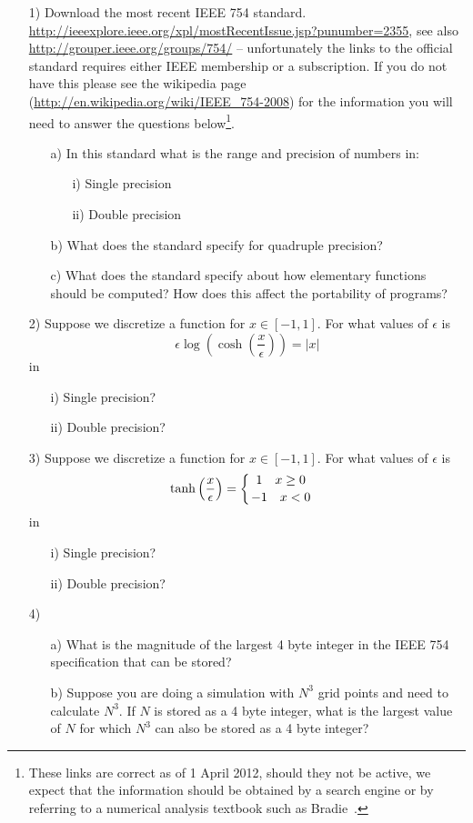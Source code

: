 \begin{enumerate}
\item[1)] Download the most recent IEEE 754 standard. \url{http://ieeexplore.ieee.org/xpl/mostRecentIssue.jsp?punumber=2355}, see also \url{http://grouper.ieee.org/groups/754/} -- unfortunately the links to the official standard requires either IEEE membership or a subscription. If you do not have this please see the wikipedia page (\url{http://en.wikipedia.org/wiki/IEEE_754-2008}) for the information you will need to answer the questions below\footnote{These links are correct as of 1 April 2012, should they not be active, we expect that the information should be obtained by a search engine or by referring to a numerical analysis textbook such as Bradie~\cite{Bra06}.}.
\begin{enumerate}
\item[a)] In this standard what is the range and precision of numbers in:
\begin{enumerate}
\item[i)] Single precision
\item[ii)] Double precision
\end{enumerate} 
\item[b)] What does the standard specify for quadruple precision?
\item[c)] What does the standard specify about how elementary functions should be computed? How does this affect the portability of programs?
\end{enumerate}
\item[2)] Suppose we discretize a function for $x\in[-1,1]$. For what values of $\epsilon$ is
$$\epsilon\log\left(\cosh\left(\frac{x}{\epsilon}\right)\right)=\lvert x \rvert$$
in
\begin{enumerate}
\item[i)] Single precision?
\item[ii)] Double precision?
\end{enumerate} 
\item[3)] Suppose we discretize a function for $x\in[-1,1]$. For what values of $\epsilon$ is
\begin{align*}
&{}\tanh\left(\frac{x}{\epsilon}\right)
=\left\{{1 \quad x\geq0}\atop{-1 \quad x < 0}\right.
\end{align*}
in
\begin{enumerate}
\item[i)] Single precision?
\item[ii)] Double precision?
\end{enumerate} 
\item[4)] 
\begin{enumerate}
\item[a)] What is the magnitude of the largest  4 byte integer in  the IEEE 754  specification that can be stored?
\item[b)] Suppose you are doing a simulation with $N^3$ grid points and need to calculate $N^3$. If $N$ is stored as a 4 byte integer, what is the largest value of $N$ for which $N^3$ can also be stored as a 4 byte integer?
\end{enumerate}
\end{enumerate}
